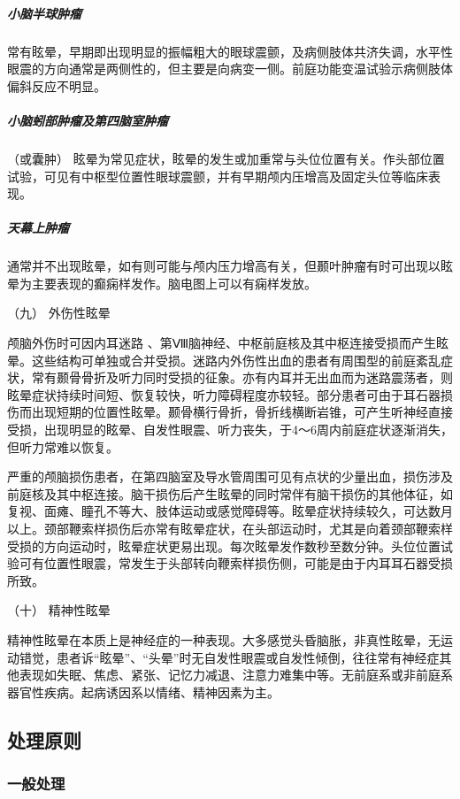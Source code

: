 \subparagraph{小脑半球肿瘤}

常有眩晕，早期即出现明显的振幅粗大的眼球震颤，及病侧肢体共济失调，水平性眼震的方向通常是两侧性的，但主要是向病变一侧。前庭功能变温试验示病侧肢体偏斜反应不明显。

\subparagraph{小脑蚓部肿瘤及第四脑室肿瘤}

（或囊肿）
眩晕为常见症状，眩晕的发生或加重常与头位位置有关。作头部位置试验，可见有中枢型位置性眼球震颤，并有早期颅内压增高及固定头位等临床表现。

\subparagraph{天幕上肿瘤}

通常并不出现眩晕，如有则可能与颅内压力增高有关，但颞叶肿瘤有时可出现以眩晕为主要表现的癫痫样发作。脑电图上可以有痫样发放。

\hypertarget{text00012.htmlux5cux23CHP1-3-2-6-9}{}
（九） 外伤性眩晕

颅脑外伤时可因内耳迷路
、第Ⅷ脑神经、中枢前庭核及其中枢连接受损而产生眩晕。这些结构可单独或合并受损。迷路内外伤性出血的患者有周围型的前庭紊乱症状，常有颞骨骨折及听力同时受损的征象。亦有内耳并无出血而为迷路震荡者，则眩晕症状持续时间短、恢复较快，听力障碍程度亦较轻。部分患者可由于耳石器损伤而出现短期的位置性眩晕。颞骨横行骨折，骨折线横断岩锥，可产生听神经直接受损，出现明显的眩晕、自发性眼震、听力丧失，于4～6周内前庭症状逐渐消失，但听力常难以恢复。

严重的颅脑损伤患者，在第四脑室及导水管周围可见有点状的少量出血，损伤涉及前庭核及其中枢连接。脑干损伤后产生眩晕的同时常伴有脑干损伤的其他体征，如复视、面瘫、瞳孔不等大、肢体运动或感觉障碍等。眩晕症状持续较久，可达数月以上。颈部鞭索样损伤后亦常有眩晕症状，在头部运动时，尤其是向着颈部鞭索样受损的方向运动时，眩晕症状更易出现。每次眩晕发作数秒至数分钟。头位位置试验可有位置性眼震，常发生于头部转向鞭索样损伤侧，可能是由于内耳耳石器受损所致。

\hypertarget{text00012.htmlux5cux23CHP1-3-2-6-10}{}
（十） 精神性眩晕

精神性眩晕在本质上是神经症的一种表现。大多感觉头昏脑胀，非真性眩晕，无运动错觉，患者诉“眩晕”、“头晕”时无自发性眼震或自发性倾倒，往往常有神经症其他表现如失眠、焦虑、紧张、记忆力减退、注意力难集中等。无前庭系或非前庭系器官性疾病。起病诱因系以情绪、精神因素为主。

\subsection{处理原则}

\subsubsection{一般处理}

